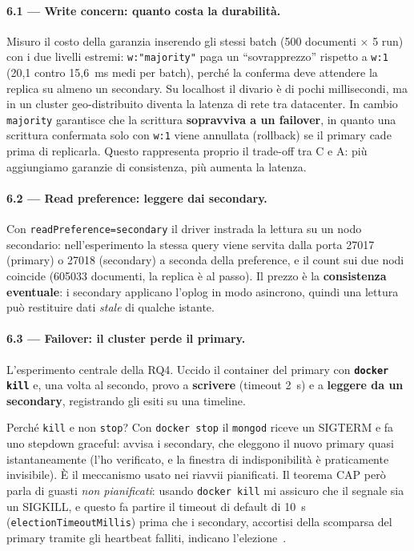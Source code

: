 \documentclass{article}
\begin{document}
\paragraph{6.1 --- Write concern: quanto costa la durabilità.} Misuro il costo
della garanzia inserendo gli stessi batch (500 documenti $\times$ 5 run) con i due
livelli estremi: \texttt{w:"majority"} paga un ``sovrapprezzo'' rispetto a
\texttt{w:1} (20{,}1 contro 15{,}6~ms medi per batch), perché la conferma deve
attendere la replica su almeno un secondary. Su localhost il divario è di pochi
millisecondi, ma in un cluster geo-distribuito diventa la latenza di rete tra
datacenter. In cambio \texttt{majority} garantisce che la scrittura
\textbf{sopravviva a un failover}, in quanto una scrittura confermata solo con
\texttt{w:1} viene annullata (rollback) se il primary cade prima di replicarla.
Questo rappresenta proprio il trade-off tra C e A: più aggiungiamo garanzie di
consistenza, più aumenta la latenza.

\paragraph{6.2 --- Read preference: leggere dai secondary.} Con
\texttt{readPreference=secondary} il driver instrada la lettura su un nodo
secondario: nell'esperimento la stessa query viene servita dalla porta 27017
(primary) o 27018 (secondary) a seconda della preference, e il count sui due nodi
coincide (\num{605033} documenti, la replica è al passo). Il prezzo è la
\textbf{consistenza eventuale}: i secondary applicano l'oplog in modo asincrono,
quindi una lettura può restituire dati \emph{stale} di qualche istante.

\paragraph{6.3 --- Failover: il cluster perde il primary.} L'esperimento centrale
della RQ4. Uccido il container del primary con \textbf{\texttt{docker kill}} e,
una volta al secondo, provo a \textbf{scrivere} (timeout 2~s) e a \textbf{leggere
da un secondary}, registrando gli esiti su una timeline.

Perché \texttt{kill} e non \texttt{stop}? Con \texttt{docker stop} il
\texttt{mongod} riceve un SIGTERM e fa uno stepdown graceful: avvisa i secondary,
che eleggono il nuovo primary quasi istantaneamente (l'ho verificato, e la
finestra di indisponibilità è praticamente invisibile). È il meccanismo usato nei
riavvii pianificati. Il teorema CAP però parla di guasti \emph{non pianificati}:
usando \texttt{docker kill} mi assicuro che il segnale sia un SIGKILL, e questo fa
partire il timeout di default di 10~s (\texttt{electionTimeoutMillis}) prima che i
secondary, accortisi della scomparsa del primary tramite gli heartbeat falliti,
indicano l'elezione~\cite{Ongaro2014Raft}.
\end{document}
